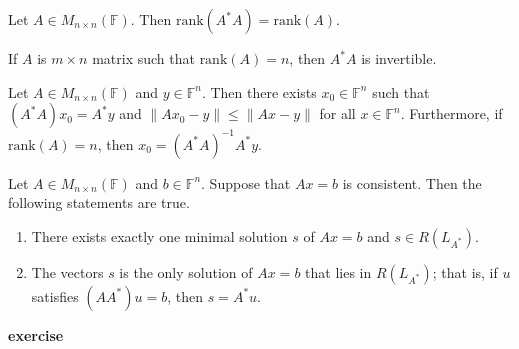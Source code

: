 \vspace{2cm}
\begin{lemma}
    Let \(A \in M_{n \times n}(\mathbb{F})\). Then \(\text{rank}(A^*A) = \text{rank}(A)\).
\end{lemma}
\vspace{2cm}
\begin{corollary}
    If \(A\) is \(m \times n\) matrix such that \(\text{rank}(A) = n\), then \(A^*A\) is invertible.
\end{corollary}
\vspace{1cm}
\begin{theorem}
    Let \(A \in M_{n \times n}(\mathbb{F})\) and \(y \in \mathbb{F}^n\). Then there exists \(x_0 \in \mathbb{F}^n\) such that \((A^*A)x_0 = A^*y\) and \(\lVert Ax_0 - y \rVert \leq \lVert Ax - y \rVert\) for all \(x \in \mathbb{F}^n\).
    Furthermore, if \(\text{rank}(A) = n\), then \(x_0 = (A^*A)^{-1}A^*y\).
\end{theorem}
\vspace{3cm}
\begin{theorem}
    Let \(A \in M_{n \times n}(\mathbb{F})\) and \(b \in \mathbb{F}^n\). Suppose that \(Ax=b\) is consistent. Then the following statements are true.
    \begin{enumerate}
        \item There exists exactly one minimal solution \(s\) of \(Ax=b\) and \(s \in R(L_{A^*})\).
        \item The vectors \(s\) is the only solution of \(Ax=b\) that lies in \(R(L_{A^*})\); that is, if \(u\) satisfies \((AA^*)u = b\), then \(s=A^*u\).
    \end{enumerate}
\end{theorem}
\newpage
\textbf{exercise}
